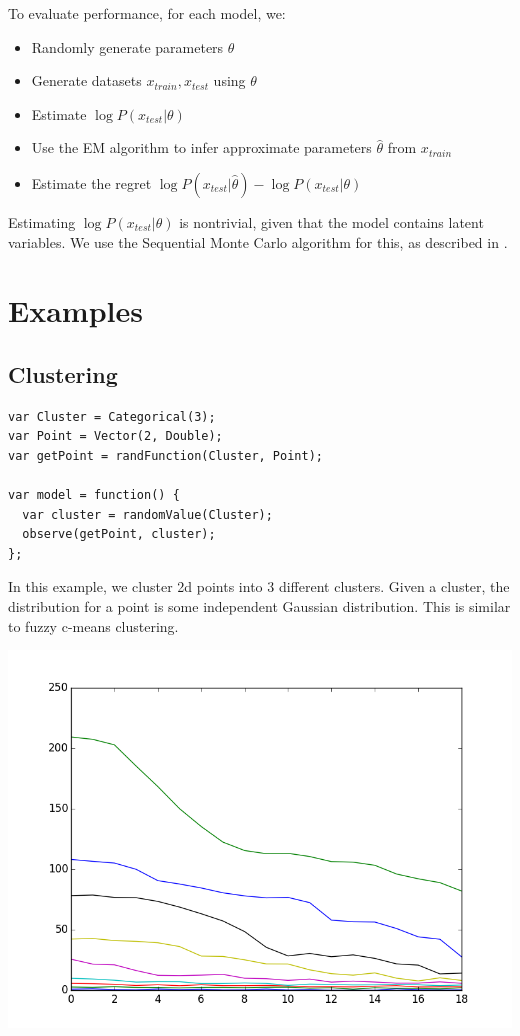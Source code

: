 \documentclass{article}
\begin{document}
    To evaluate performance, for each model, we:
    \begin{itemize}
      \item
        Randomly generate parameters $\theta$
      \item
        Generate datasets $x_{train}, x_{test}$ using $\theta$
      \item
        Estimate $\log P(x_{test} | \theta)$
      \item
        Use the EM algorithm to infer approximate parameters $\hat{\theta}$ from $x_{train}$
      \item
        Estimate the regret $\log P(x_{test} | \hat{\theta}) - \log P(x_{test} | \theta)$
    \end{itemize}
    Estimating $\log P(x_{test} | \theta)$ is nontrivial, given that the model contains latent variables.
    We use the Sequential Monte Carlo algorithm for this, as described in \cite{dippl}.


  \section{Examples}

  \subsection{Clustering}
{\small
\begin{lstlisting}
var Cluster = Categorical(3);
var Point = Vector(2, Double);
var getPoint = randFunction(Cluster, Point);

var model = function() {
  var cluster = randomValue(Cluster);
  observe(getPoint, cluster);
};
\end{lstlisting}
}

In this example, we cluster 2d points into 3 different clusters.  Given a cluster, the distribution for a point is some independent Gaussian distribution.  This is similar to fuzzy c-means clustering.

\begin{center}
  \includegraphics[scale=0.5]{../plots/accuracy_nd_clustering.png}
\end{center}
\end{document}
